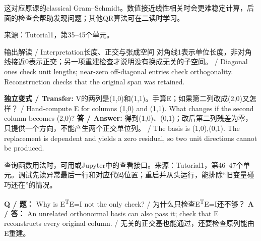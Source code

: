 这对应原课的classical Gram–Schmidt。数值接近线性相关时会更难稳定计算，后面的检查会帮助发现问题；其他QR算法可在二读时学习。


来源：Tutorial1，第35–45个单元。












\begin{StudyBlock}{输出解读 / Interpretation}{长度、正交与张成空间}
对角线1表示单位长度，非对角线接近0表示正交；另一项重建检查才说明没有换成无关的子空间。 / Diagonal ones check unit lengths; near-zero off-diagonal entries check orthogonality. Reconstruction checks that the original span was retained.
\end{StudyBlock}


\textbf{独立变式 / Transfer:} V的两列是(1,0)和(1,1)。手算E；如果第二列改成(2,0)又怎样？ / Hand-compute E for columns (1,0) and (1,1). What changes if the second column becomes (2,0)?
\textbf{答 / Answer:} 得到(1,0)、(0,1)；改后第二列残差为零，只提供一个方向，不能产生两个正交单位列。 / The basis is (1,0),(0,1). The replacement is dependent and yields a zero residual, so two unit directions cannot be produced.











查询函数用法时，可用或Jupyter中的查看接口。来源：Tutorial1，第46–47个单元。调试先读异常最后一行和对应代码位置；重启并从头运行，能排除“旧变量碰巧还在”的情况。


\textbf{Q / 题：} Why is E\textsuperscript{T}E=I not the only check? / 为什么只检查E\textsuperscript{T}E=I还不够？
\textbf{A / 答：} An unrelated orthonormal basis can also pass it; check that E reconstructs every original column. / 无关的正交基也能通过，还要检查原列能由E重建。


